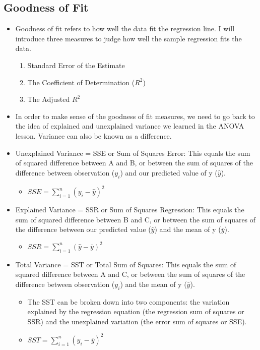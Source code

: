 \documentclass[
  letterpaper,
  DIV=11,
  numbers=noendperiod]{scrreprt}
\providecommand{\tightlist}{%
  \setlength{\itemsep}{0pt}\setlength{\parskip}{0pt}}\usepackage{longtable,booktabs,array}
\begin{document}
\subsection{Goodness of Fit}\label{goodness-of-fit}

\begin{itemize}
\tightlist
\item
  Goodness of fit refers to how well the data fit the regression line. I
  will introduce three measures to judge how well the sample regression
  fits the data.

  \begin{enumerate}
  \def\labelenumi{\arabic{enumi}.}
  \tightlist
  \item
    Standard Error of the Estimate
  \item
    The Coefficient of Determination (\(R^2\))
  \item
    The Adjusted \(R^2\)
  \end{enumerate}
\item
  In order to make sense of the goodness of fit measures, we need to go
  back to the idea of explained and unexplained variance we learned in
  the ANOVA lesson. Variance can also be known as a difference.\\
\item
  Unexplained Variance = SSE or Sum of Squares Error: This equals the
  sum of squared difference between A and B, or between the sum of
  squares of the difference between observation (\(y_i\)) and our
  predicted value of y (\(\hat{y}\)).

  \begin{itemize}
  \tightlist
  \item
    \(SSE = \sum^n_{i=1}(y_i - \hat{y})^2\)
  \end{itemize}
\item
  Explained Variance = SSR or Sum of Squares Regression: This equals the
  sum of squared difference between B and C, or between the sum of
  squares of the difference between our predicted value (\(\hat{y}\))
  and the mean of y (\(\bar{y}\)).

  \begin{itemize}
  \tightlist
  \item
    \(SSR = \sum^n_{i=1}(\hat{y} - \bar{y})^2\)
  \end{itemize}
\item
  Total Variance = SST or Total Sum of Squares: This equals the sum of
  squared difference between A and C, or between the sum of squares of
  the difference between observation (\(y_i\)) and the mean of y
  (\(\bar{y}\)).

  \begin{itemize}
  \tightlist
  \item
    The SST can be broken down into two components: the variation
    explained by the regression equation (the regression sum of squares
    or SSR) and the unexplained variation (the error sum of squares or
    SSE).
  \item
    \(SST = \sum^n_{i=1}(y_i - \bar{y})^2\)
  \end{itemize}
\end{itemize}
\end{document}
